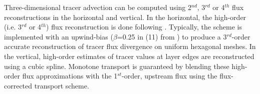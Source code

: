 Three-dimensional tracer advection can be computed using 2$^{nd}$, 3$^{rd}$ or 4$^{th}$ flux reconstructions in the horizontal and vertical. In the horizontal, the high-order (i.e. 3$^{rd}$ or 4$^{th}$) flux reconstruction is done following \cite{Skamarock:2011tc}. Typically, the scheme is implemented with an upwind-bias ($\beta$=0.25 in (11) from \cite{Skamarock:2011tc}) to produce a 3$^{rd}$-order accurate reconstruction of tracer flux divergence on uniform hexagonal meshes. In the vertical, high-order estimates of tracer values at layer edges are reconstructed using a cubic spline. Monotone transport is guaranteed by blending these high-order flux approximations with the 1$^{st}$-order, upstream flux using the \cite{Zalesak:1979wm} flux-corrected transport scheme.